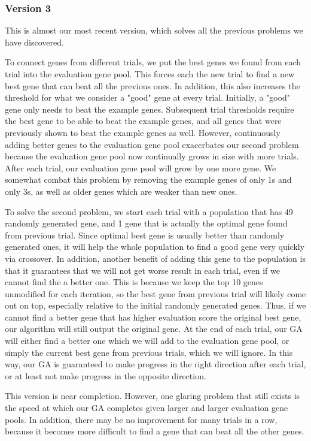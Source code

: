 \documentclass[twoside]{article}
\begin{document}
\begin{multicols}{2}
\subsubsection{Version 3}
This is almost our most recent version, which solves all the previous problems we have discovered.

To connect genes from different trials, we put the best genes we found from each trial into the evaluation gene pool. This forces each the new trial to find a new best gene that can beat all the previous ones. In addition, this also increases the threshold for what we consider a "good" gene at every trial. Initially, a "good" gene only needs to beat the example genes. Subsequent trial thresholds require the best gene to be able to beat the example genes, and all genes that were previously shown to beat the example genes as well. However, continuously adding better genes to the evaluation gene pool exacerbates our second problem because the evaluation gene pool now continually grows in size with more trials. After each trial, our evaluation gene pool will grow by one more gene. We somewhat combat this problem by removing the example genes of only 1s and only 3s, as well as older genes which are weaker than new ones. 

To solve the second problem, we start each trial with a population that has 49 randomly generated gene, and 1 gene that is actually the optimal gene found from previous trial. Since optimal best gene is usually better than randomly generated ones, it will help the whole population to find a good gene very quickly via crossover. In addition, another benefit of adding this gene to the population is that it guarantees that we will not get worse result in each trial, even if we cannot find the a better one. This is because we keep the top 10 genes unmodified for each iteration, so the best gene from previous trial will likely come out on top, especially relative to the initial randomly generated genes. Thus, if we cannot find a better gene that has higher evaluation score the original best gene, our algorithm will still output the original gene. At the end of each trial, our GA will either find a better one which we will add to the evaluation gene pool, or simply the current best gene from previous trials, which we will ignore. In this way, our GA is guaranteed to make progress in the right direction after each trial, or at least not make progress in the opposite direction.

This version is near completion. However, one glaring problem that still exists is the speed at which our GA completes given larger and larger evaluation gene pools. In addition, there may be no improvement for many trials in a row, because it becomes more difficult to find a gene that can beat all the other genes.


\end{multicols}
\end{document}
